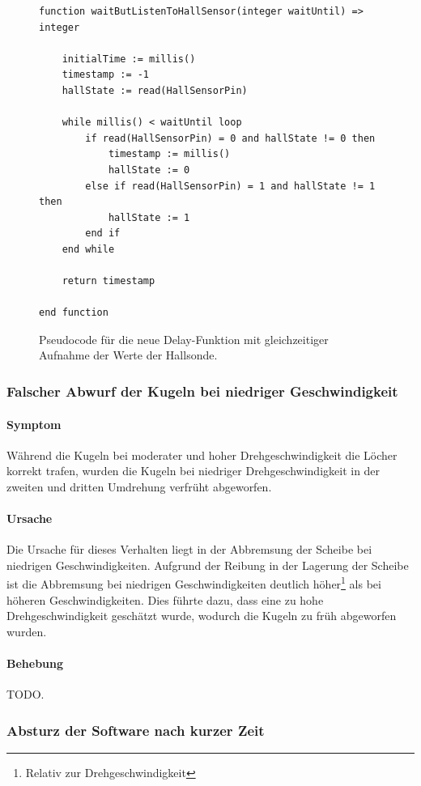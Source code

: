 \documentclass{kis}
\begin{document}
\begin{figure}
\lstset{basicstyle=\small\ttfamily,tabsize=3}
{\singlespacing
\begin{lstlisting}[frame=single]
function waitButListenToHallSensor(integer waitUntil) => integer
	
	initialTime := millis()
	timestamp := -1
	hallState := read(HallSensorPin)
	
	while millis() < waitUntil loop
		if read(HallSensorPin) = 0 and hallState != 0 then
			timestamp := millis()
			hallState := 0
		else if read(HallSensorPin) = 1 and hallState != 1 then
			hallState := 1
		end if
	end while
	
	return timestamp
	
end function
\end{lstlisting}
}
\caption{Pseudocode für die neue Delay-Funktion mit gleichzeitiger Aufnahme der Werte der Hallsonde.}
\label{fig:pseudo-delay}
\end{figure}

\subsubsection{Falscher Abwurf der Kugeln bei niedriger Geschwindigkeit}
\paragraph{Symptom}
Während die Kugeln bei moderater und hoher Drehgeschwindigkeit die Löcher korrekt trafen, wurden die Kugeln bei niedriger Drehgeschwindigkeit in der zweiten und dritten Umdrehung verfrüht abgeworfen.

\paragraph{Ursache}
Die Ursache für dieses Verhalten liegt in der Abbremsung der Scheibe bei niedrigen Geschwindigkeiten. Aufgrund der Reibung in der Lagerung der Scheibe ist die Abbremsung bei niedrigen Geschwindigkeiten deutlich höher\footnote{Relativ zur Drehgeschwindigkeit} als bei höheren Geschwindigkeiten. Dies führte dazu, dass eine zu hohe Drehgeschwindigkeit geschätzt wurde, wodurch die Kugeln zu früh abgeworfen wurden.

\paragraph{Behebung}
TODO.

\subsubsection{Absturz der Software nach kurzer Zeit}
\end{document}
